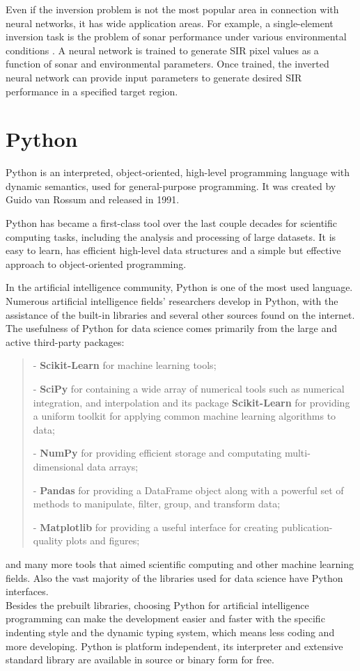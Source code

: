 Even if the inversion problem is not the most popular area in connection with neural networks, it has wide application areas. For example, a single-element inversion task is the problem of sonar performance under various environmental conditions \cite{article}. A neural network is trained to generate SIR pixel values as a function of sonar and environmental parameters. Once trained, the inverted neural network can provide input parameters to generate desired SIR performance in a specified target region. 



\section{Python}

Python is an interpreted, object-oriented, high-level programming language with dynamic semantics, used for general-purpose programming. It was created by Guido van Rossum and released in 1991. \medskip

Python has became a first-class tool over the last couple decades for scientific computing tasks, including the analysis and processing of large datasets. It is easy to learn, has efficient high-level data structures and a simple but effective approach to object-oriented programming.\medskip

In the artificial intelligence community, Python is one of the most used language. Numerous artificial intelligence fields' researchers develop in Python, with the assistance of the built-in libraries and several other sources found on the internet. The usefulness of Python for data science comes primarily from the large and active third-party packages: 
\begin{verse}
	- \textbf{Scikit-Learn} for machine learning tools;
	
	- \textbf{SciPy} for containing a wide array of numerical tools such as numerical integration, and interpolation and its package \textbf{Scikit-Learn} for providing a uniform toolkit for applying common machine learning algorithms to data;
	
	- \textbf{NumPy} for providing efficient storage and computating multi-dimensional data arrays;
	
	-  \textbf{Pandas} for providing a DataFrame object along with a powerful set of methods to manipulate, filter, group, and transform data; 
	
	- \textbf{Matplotlib} for providing a useful interface for creating publication-quality plots and figures;
\end{verse} 
and many more tools that aimed scientific computing and other machine learning fields. Also the vast majority of the libraries used for data science have Python interfaces.\\ 
Besides the prebuilt libraries, choosing Python for artificial intelligence programming can make the development easier and faster with the specific indenting style and the dynamic typing system, which means less coding and more developing. Python is platform independent, its interpreter and extensive standard library are available in source or binary form for free.